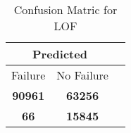 \begin{table}[] 
\caption{Confusion Matric for LOF} 
\label{Table: Prediction Accuracy-NoneLOF90.0EKF-ignoreReflection-Reflection} 
\centering 
\begin{tabular} 
 {@{}ccc@{}} 
\toprule 
\multicolumn{2}{c}{\textbf{Predicted}}
 \\ \midrule 
\multicolumn{1}{|c|}{Failure} & 
\multicolumn{1}{c|}{No Failure}
 \\ \midrule 
\multicolumn{1}{|c|}{\color{green}\textbf{90961}} & 
\multicolumn{1}{c|}{\color{green}\textbf{63256}}
 \\ \midrule 
\multicolumn{1}{|c|}{\color{red}\textbf{66}} & 
\multicolumn{1}{c|}{\color{red}\textbf{15845}}
 \\ \bottomrule 
\end{tabular} 
\end{table} 
